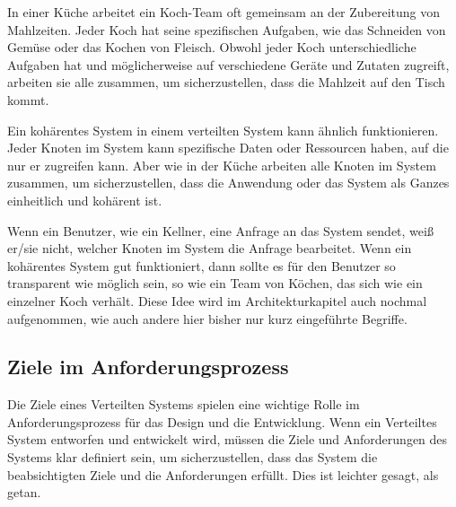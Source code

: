 \documentclass[../vs-script-first-v01.tex]{subfiles}
\begin{document}
In einer Küche arbeitet ein Koch-Team oft gemeinsam an der Zubereitung von Mahlzeiten. Jeder Koch hat seine spezifischen Aufgaben, wie das Schneiden von Gemüse oder das Kochen von Fleisch. Obwohl jeder Koch unterschiedliche Aufgaben hat und möglicherweise auf verschiedene Geräte und Zutaten zugreift, arbeiten sie alle zusammen, um sicherzustellen, dass die Mahlzeit auf den Tisch kommt.

Ein kohärentes System in einem verteilten System kann ähnlich funktionieren. Jeder Knoten im System kann spezifische Daten oder Ressourcen haben, auf die nur er zugreifen kann. Aber wie in der Küche arbeiten alle Knoten im System zusammen, um sicherzustellen, dass die Anwendung oder das System als Ganzes einheitlich und kohärent ist.

Wenn ein Benutzer, wie ein Kellner, eine Anfrage an das System sendet, weiß er/sie nicht, welcher Knoten im System die Anfrage bearbeitet. Wenn ein kohärentes System gut funktioniert, dann sollte es für den Benutzer so transparent wie möglich sein, so wie ein Team von Köchen, das sich wie ein einzelner Koch verhält. Diese Idee wird im Architekturkapitel auch nochmal aufgenommen, wie auch andere hier bisher nur kurz eingeführte Begriffe. 

\subsection{Ziele im Anforderungsprozess}
Die Ziele eines Verteilten Systems spielen eine wichtige Rolle im Anforderungsprozess für das Design und die Entwicklung. Wenn ein Verteiltes System entworfen und entwickelt wird, müssen die Ziele und Anforderungen des Systems klar definiert sein, um sicherzustellen, dass das System die beabsichtigten Ziele und die Anforderungen erfüllt. Dies ist leichter gesagt, als getan.
\end{document}
